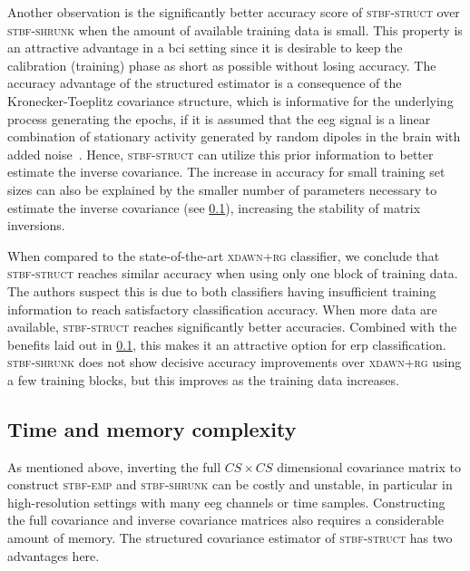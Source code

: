 	Another observation is the significantly better accuracy score of
	\textsc{stbf-struct} over \textsc{stbf-shrunk} when the amount of available training data is small.
	This property is an attractive advantage in a \ac{bci} setting since it is desirable to keep the calibration (training) phase as short as possible without losing accuracy.
	The accuracy advantage of the structured estimator is a consequence of the
	Kronecker-Toeplitz covariance structure, which is informative for the
	underlying process generating the epochs, if it is assumed that the \ac{eeg} signal
	is a linear combination of stationary activity generated by random dipoles in
	the brain with added noise~\cite{Munck1992, DeMunck2002, GonzalezNavarro2017}.
	Hence, \textsc{stbf-struct} can utilize this prior information to better estimate the inverse
	covariance.
	The increase in accuracy for small training set sizes can also be explained by the smaller number of parameters necessary to estimate the inverse covariance (see \cref{sec:stbf-struct/discussion/param-complex}), increasing the stability of matrix inversions.

	When compared to the state-of-the-art \textsc{xdawn+rg} classifier, we conclude
	that \textsc{stbf-struct} reaches similar accuracy when using only one block of
	training data.
	The authors suspect this is due to both
	classifiers having insufficient training information to reach
	satisfactory classification accuracy.
	When more data are available, \textsc{stbf-struct} reaches significantly better accuracies.
	Combined with the benefits laid out in \cref{sec:stbf-struct/discussion/param-complex}, this
  makes it an attractive option for \ac{erp} classification.
	\textsc{stbf-shrunk} does not show decisive accuracy improvements over
	\textsc{xdawn+rg} using a few training blocks, but this improves as the training data increases.

	\subsection{Time and memory complexity}
	\label{sec:stbf-struct/discussion/param-complex}
	As mentioned above, inverting the full $CS \times CS$ dimensional covariance
	matrix to construct \textsc{stbf-emp} and \textsc{stbf-shrunk} can be costly
	and unstable, in particular in high-resolution settings with many \ac{eeg} channels or time samples.
	Constructing the full covariance and inverse covariance matrices also requires a considerable amount of memory.
	The structured covariance estimator of \textsc{stbf-struct} has two advantages here.

